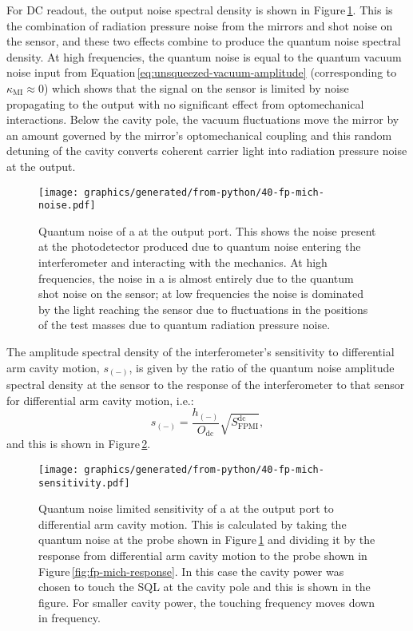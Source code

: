 For \gls{DC} readout, the output noise spectral density is shown in Figure\,\ref{fig:fp-mich-noise}. This is the combination of radiation pressure noise from the mirrors and shot noise on the sensor, and these two effects combine to produce the quantum noise spectral density. At high frequencies, the quantum noise is equal to the quantum vacuum noise input from Equation\,\ref{eq:unsqueezed-vacuum-amplitude} (corresponding to $\kappa_{\text{MI}} \approx 0$) which shows that the signal on the sensor is limited by noise propagating to the output with no significant effect from optomechanical interactions. Below the cavity pole, the vacuum fluctuations move the mirror by an amount governed by the mirror's optomechanical coupling and this random detuning of the cavity converts coherent carrier light into radiation pressure noise at the output.

\begin{figure}
  \centering
  \texttt{[image: graphics/generated/from-python/40-fp-mich-noise.pdf]}
  \caption[Quantum noise of a \FPMI{} at the output port]{\label{fig:fp-mich-noise}Quantum noise of a \FPMI{} at the output port. This shows the noise present at the photodetector produced due to quantum noise entering the interferometer and interacting with the mechanics. At high frequencies, the noise in a \MI{} is almost entirely due to the quantum shot noise on the sensor; at low frequencies the noise is dominated by the light reaching the sensor due to fluctuations in the positions of the test masses due to quantum radiation pressure noise.}
\end{figure}

The amplitude spectral density of the interferometer's sensitivity to differential arm cavity motion, $s_{\left( - \right)}$, is given by the ratio of the quantum noise amplitude spectral density at the sensor to the response of the interferometer to that sensor for differential arm cavity motion, i.e.:
\begin{equation}
  s_{\left( - \right)} = \frac{h_{\left( - \right)}}{O_{\text{dc}}} \sqrt{S_{\text{FPMI}}^{\text{dc}}},
\end{equation}
and this is shown in Figure\,\ref{fig:fp-mich-sensitivity}.

\begin{figure}
  \centering
  \texttt{[image: graphics/generated/from-python/40-fp-mich-sensitivity.pdf]}
  \caption[Sensitivity of a \FPMI{} at the output port to differential arm cavity motion]{\label{fig:fp-mich-sensitivity}Quantum noise limited sensitivity of a \FPMI{} at the output port to differential arm cavity motion. This is calculated by taking the quantum noise at the probe shown in Figure\,\ref{fig:fp-mich-noise} and dividing it by the response from differential arm cavity motion to the probe shown in Figure\,\ref{fig:fp-mich-response}. In this case the cavity power was chosen to touch the \gls{SQL} at the cavity pole and this is shown in the figure. For smaller cavity power, the touching frequency moves down in frequency.}
\end{figure}

